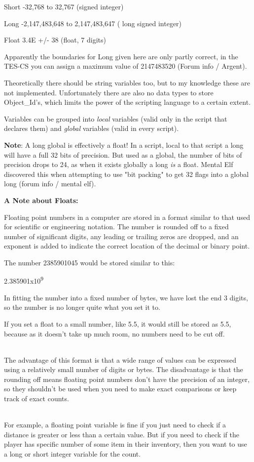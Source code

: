 \documentclass[
]{article}
\begin{document}
Short -32,768 to 32,767 (signed integer)

Long -2,147,483,648 to 2,147,483,647 ( long signed integer)

Float 3.4E +/- 38 (float, 7 digits)

Apparently the boundaries for Long given here are only partly correct,
in the TES-CS you can assign a maximum value of 2147483520 (Forum info /
Argent).

Theoretically there should be string variables too, but to my knowledge
these are not implemented. Unfortunately there are also no data types to
store Object\_Id's, which limits the power of the scripting language to
a certain extent.

Variables can be grouped into \emph{local} variables (valid only in the
script that declares them) and \emph{global} variables (valid in every
script).

\textbf{Note}: A long global is effectively a float! In a script, local
to that script a long will have a full 32 bits of precision. But used as
a global, the number of bits of precision drops to 24, as when it exists
globally a long \emph{is} a float. Mental Elf discovered this when
attempting to use "bit packing" to get 32 flags into a global long
(forum info / mental elf).

\textbf{A Note about Floats:}

Floating point numbers in a computer are stored in a format similar to
that used for scientific or engineering notation. The number is rounded
off to a fixed number of significant digits, any leading or trailing
zeros are dropped, and an exponent is added to indicate the correct
location of the decimal or binary point.

The number 2385901045 would be stored similar to this:

2.385901x10\textsuperscript{9}

In fitting the number into a fixed number of bytes, we have lost the end
3 digits, so the number is no longer quite what you set it to.

If you set a float to a small number, like 5.5, it would still be stored
as 5.5, because as it doesn't take up much room, no numbers need to be
cut off.\\
\strut \\
The advantage of this format is that a wide range of values can be
expressed using a relatively small number of digits or bytes. The
disadvantage is that the rounding off means floating point numbers don't
have the precision of an integer, so they shouldn't be used when you
need to make exact comparisons or keep track of exact counts.\\
\strut \\
For example, a floating point variable is fine if you just need to check
if a distance is greater or less than a certain value. But if you need
to check if the player has specific number of some item in their
inventory, then you want to use a long or short integer variable for the
count.
\end{document}

